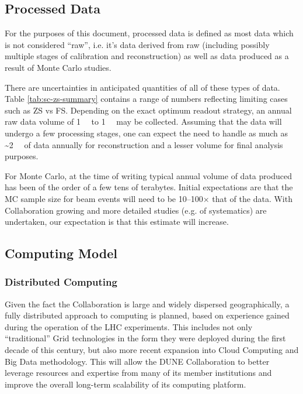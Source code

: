 \subsection{Processed Data}
\label{sec:detectors-sc-infrastructure-processed-data}
For the purposes of this document, processed data is defined as most
data which is not considered ``raw'', i.e. it's data derived from raw
(including possibly multiple stages of calibration and reconstruction)
as well as data produced as a result of Monte Carlo studies.

There are uncertainties in anticipated quantities of all of these
types of data. Table \ref{tab:sc-zs-summary} contains a range of
numbers reflecting limiting cases such as ZS vs FS.  Depending on the
exact optimum readout strategy, an annual raw data volume of
\SI{1}{\tera\byte} to \SI{1}{\peta\byte} may be collected.  Assuming
that the data will undergo a few processing stages, one can expect the
need to handle as much as \textasciitilde \SI{2}{\peta\byte} of data
annually for reconstruction and a lesser volume for final analysis
purposes.

For Monte Carlo, at the time of writing typical annual volume of data
produced has been of the order of a few tens of terabytes.  Initial
expectations are that the MC sample size for beam events will need to
be 10--100$\times$ that of the data.  With Collaboration growing
and more detailed studies (e.g. of systematics) are undertaken, our
expectation is that this estimate will increase.

\subsection{Computing Model}
\label{sec:detectors-sc-infrastructure-computing-model}

\subsubsection{Distributed Computing}

Given the fact the Collaboration is large and widely dispersed
geographically, a fully distributed approach to computing is planned,
based on experience gained during the operation of the LHC
experiments. This includes not only ``traditional'' Grid technologies
in the form they were deployed during the first decade of this
century, but also more recent expansion into Cloud Computing and Big
Data methodology. This will allow the DUNE Collaboration to better
leverage resources and expertise from many of its member institutions
and improve the overall long-term scalability of its computing
platform.

